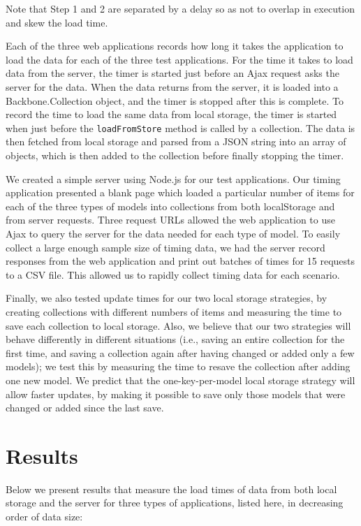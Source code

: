 \documentclass[12pt]{article}
\begin{document}
Note that Step 1 and 2 are separated by a delay so as not to overlap in
execution and skew the load time.

Each of the three web applications records how long it takes the application to
load the data for each of the three test applications. For the time it takes to
load data from the server, the timer is started just before an Ajax request
asks the server for the data. When the data returns from the server, it is
loaded into a Backbone.Collection object, and the timer is stopped after this
is complete. To record the time to load the same data from local storage, the
timer is started when just before the \verb=loadFromStore= method is called by
a collection. The data is then fetched from local storage and parsed from a JSON
string into an array of objects, which is then added to the collection before
finally stopping the timer.

We created a simple server using Node.js \cite{node} for our test applications. Our timing
application presented a blank page which loaded a particular number of items
for each of the three types of models into collections from both localStorage
and from server requests. Three request URLs allowed the web application to use
Ajax to query the server for the data needed for each type of model. To easily
collect a large enough sample size of timing data, we had the server record
responses from the web application and print out batches of times for 15
requests to a CSV file. This allowed us to rapidly collect timing data for each
scenario.

Finally, we also tested update times for our two local storage strategies, by
creating collections with different numbers of items and measuring the time to
save each collection to local storage. Also, we believe that our two strategies
will behave differently in different situations (i.e., saving an entire
collection for the first time, and saving a collection again after having
changed or added only a few models); we test this by measuring the time to
resave the collection after adding one new model. We predict that the
one-key-per-model local storage strategy will allow faster updates, by making
it possible to save only those models that were changed or added since the last
save.

\section{Results}

Below we present results that measure the load times of data from both local
storage and the server for three types of applications, listed here, in
decreasing order of data size:
\end{document}

